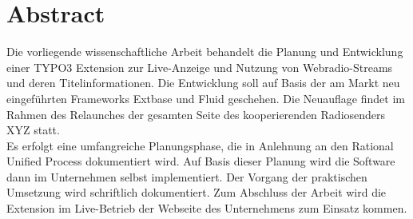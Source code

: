 
\chapter*{Abstract}
\label{cha:Abstract}

\thispagestyle{empty}


Die vorliegende wissenschaftliche Arbeit behandelt die Planung und Entwicklung einer TYPO3 Extension zur Live-Anzeige und Nutzung von Webradio-Streams und deren Titelinformationen. Die Entwicklung soll auf Basis der am Markt neu eingef\"uhrten Frameworks Extbase und Fluid geschehen. Die Neuauflage findet im Rahmen des Relaunches der gesamten Seite des kooperierenden Radiosenders XYZ statt. 
\\
Es erfolgt eine umfangreiche Planungsphase, die in Anlehnung an den Rational Unified Process dokumentiert wird. Auf Basis dieser Planung wird die Software dann im Unternehmen selbst implementiert. Der Vorgang der praktischen Umsetzung wird schriftlich dokumentiert. Zum Abschluss der Arbeit wird die Extension im Live-Betrieb der Webseite des Unternehmens zum Einsatz kommen.